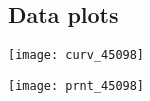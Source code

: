 \documentclass{article}
\begin{document}
\begin{multicols}{2}
\section{Data plots}

\begin{center}
\texttt{[image: curv\_45098]}
\end{center}


\end{multicols}

\begin{center}
\texttt{[image: prnt\_45098]}
\end{center}
\end{document}

